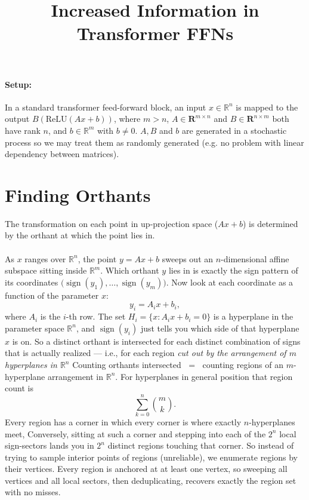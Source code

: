 \documentclass{article}
\title{Increased Information in Transformer FFNs}
\author{}
\date{}
\begin{document}
\paragraph{Setup:} In a standard transformer feed-forward block, an input $x\in\mathbb{R}^n$ is mapped to the output $B (\text{ReLU}(Ax + b))$, where $m>n$, $A\in\mathbf{R}^{m\times n}$ and $B\in\mathbf{R}^{n\times m}$ both have rank $n$, and $b\in \mathbb{R}^m$ with $b\neq 0$. $A,B$ and $b$ are generated in a stochastic process so we may treat them as randomly generated (e.g. no problem with linear dependency between matrices).

\section{Finding Orthants}\label{find-orthants}
The transformation on each point in up-projection space ($Ax+b$) is determined by the orthant at which the point lies in.\\ 
\\
As $x$ ranges over $\mathbb{R}^n$, the point $y = Ax + b$ sweeps out an $n$-dimensional affine subspace sitting inside $\mathbb{R}^m$. Which orthant $y$ lies in is exactly the sign pattern of its coordinates $\big(\operatorname{sign}(y_1),\dots,\operatorname{sign}(y_m)\big)$.
Now look at each coordinate as a function of the parameter $x$:
$$y_i = A_i x + b_i,$$
where $A_i$ is the $i$-th row. The set $H_i=\{x : A_i x + b_i = 0\}$ is a hyperplane in the parameter space $\mathbb{R}^n$, and $\operatorname{sign}(y_i)$ just tells you which side of that hyperplane $x$ is on. So a distinct orthant is intersected for each distinct combination of signs that is actually realized — i.e., for each region \textit{cut out by the arrangement of $m$ hyperplanes in $\mathbb{R}^n$} Counting orthants intersected $\;=\;$ counting regions of an $m$-hyperplane arrangement in $\mathbb{R}^n$. For hyperplanes in general position that region count is
$$
\sum_{k=0}^{n}\binom{m}{k}.
$$
Every region has a corner in which every corner is where exactly $n$-hyperplanes meet,  Conversely, sitting at such a corner and stepping into each of the $2^n$ local sign-sectors lands you in $2^n$ distinct regions touching that corner. So instead of trying to sample interior points of regions (unreliable), we enumerate regions by their vertices. Every region is anchored at at least one vertex, so sweeping all vertices and all local sectors, then deduplicating, recovers exactly the region set with no misses.\\
\\
\end{document}
